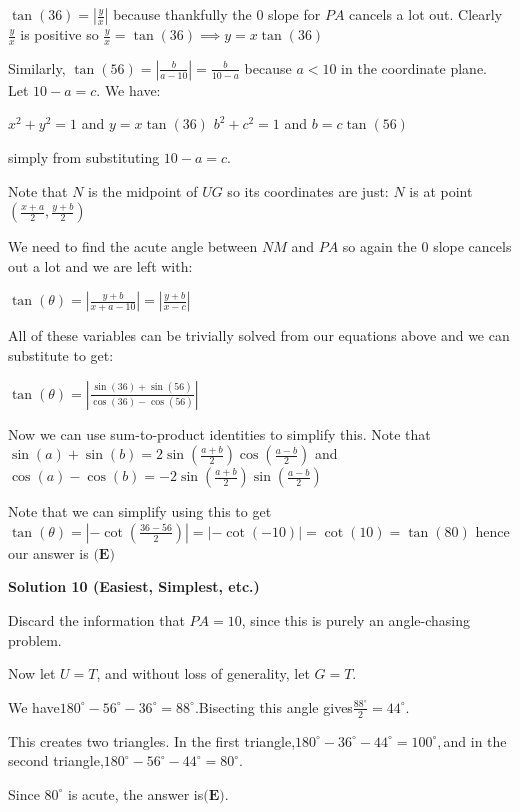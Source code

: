 \begin{enumerate}
 $\tan(36) = |\frac{y}{x}|$ because thankfully the $0$ slope for $PA$ cancels a lot out. Clearly $\frac{y}{x}$ is positive so $\frac{y}{x} = \tan(36) \implies y = x\tan(36)$

 Similarly, $\tan(56) = |\frac{b}{a - 10}| = \frac{b}{10 - a}$ because $a < 10$ in the coordinate plane. Let $10 - a = c$. We have:

 $x^{2} + y^{2} = 1$ and $y = x\tan(36)$
$b^{2} + c^{2} = 1$ and $b = c\tan(56)$

 simply from substituting $10 - a = c$. 

 Note that $N$ is the midpoint of $UG$ so its coordinates are just: $N$ is at point $(\frac{x + a}{2}, \frac{y + b}{2})$ 

 We need to find the acute angle between $NM$ and $PA$ so again the $0$ slope cancels out a lot and we are left with:

 $\tan(\theta) = |\frac{y + b}{x + a - 10}| = |\frac{y + b}{x - c}|$

 All of these variables can be trivially solved from our equations above and we can substitute to get:

 $\tan(\theta) = |\frac{\sin(36) + \sin(56)}{\cos(36) - \cos(56)}|$

 Now we can use sum-to-product identities to simplify this. Note that $\sin(a) + \sin(b) = 2\sin(\frac{a + b}{2})\cos(\frac{a - b}{2})$ and $\cos(a) - \cos(b) = -2\sin(\frac{a + b}{2})\sin(\frac{a - b}{2})$ 

 Note that we can simplify using this to get $\tan(\theta) = |-\cot(\frac{36 - 56}{2})| = |-\cot(-10)| = \cot(10) = \tan(80)$ hence our answer is $\boxed{\textbf{(E)}}$




\textbf{Solution 10 (Easiest, Simplest, etc.)}

Discard the information that $PA = 10$, since this is purely an angle-chasing problem.

 Now let $U = T$, and without loss of generality, let $G = T$.

 We have$180^\circ - 56^\circ - 36^\circ = 88^\circ.$Bisecting this angle gives$\frac{88^\circ}{2} = 44^\circ.$

 This creates two triangles. In the first triangle,$180^\circ - 36^\circ - 44^\circ = 100^\circ,$and in the second triangle,$180^\circ - 56^\circ - 44^\circ = 80^\circ.$

 Since $80^\circ$ is acute, the answer is$\boxed{\textbf{(E)}}.$





\end{enumerate}
